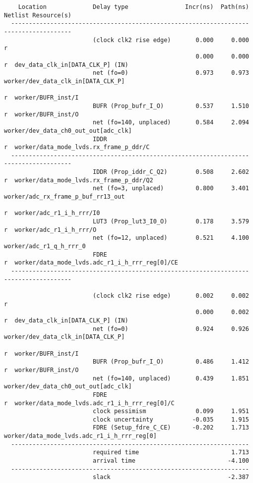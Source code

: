 \documentclass{article}
\begin{document}
\begin{lstlisting}
    Location             Delay type                Incr(ns)  Path(ns)    Netlist Resource(s)
  -------------------------------------------------------------------    -------------------
                         (clock clk2 rise edge)       0.000     0.000 r  
                                                      0.000     0.000 r  dev_data_clk_in[DATA_CLK_P] (IN)
                         net (fo=0)                   0.973     0.973    worker/dev_data_clk_in[DATA_CLK_P]
                                                                      r  worker/BUFR_inst/I
                         BUFR (Prop_bufr_I_O)         0.537     1.510 r  worker/BUFR_inst/O
                         net (fo=140, unplaced)       0.584     2.094    worker/dev_data_ch0_out_out[adc_clk]
                         IDDR                                         r  worker/data_mode_lvds.rx_frame_p_ddr/C
  -------------------------------------------------------------------    -------------------
                         IDDR (Prop_iddr_C_Q2)        0.508     2.602 r  worker/data_mode_lvds.rx_frame_p_ddr/Q2
                         net (fo=3, unplaced)         0.800     3.401    worker/adc_rx_frame_p_buf_rr13_out
                                                                      r  worker/adc_r1_i_h_rrr/I0
                         LUT3 (Prop_lut3_I0_O)        0.178     3.579 r  worker/adc_r1_i_h_rrr/O
                         net (fo=12, unplaced)        0.521     4.100    worker/adc_r1_q_h_rrr_0
                         FDRE                                         r  worker/data_mode_lvds.adc_r1_i_h_rrr_reg[0]/CE
  -------------------------------------------------------------------    -------------------

                         (clock clk2 rise edge)       0.002     0.002 r  
                                                      0.000     0.002 r  dev_data_clk_in[DATA_CLK_P] (IN)
                         net (fo=0)                   0.924     0.926    worker/dev_data_clk_in[DATA_CLK_P]
                                                                      r  worker/BUFR_inst/I
                         BUFR (Prop_bufr_I_O)         0.486     1.412 r  worker/BUFR_inst/O
                         net (fo=140, unplaced)       0.439     1.851    worker/dev_data_ch0_out_out[adc_clk]
                         FDRE                                         r  worker/data_mode_lvds.adc_r1_i_h_rrr_reg[0]/C
                         clock pessimism              0.099     1.951    
                         clock uncertainty           -0.035     1.915    
                         FDRE (Setup_fdre_C_CE)      -0.202     1.713    worker/data_mode_lvds.adc_r1_i_h_rrr_reg[0]
  -------------------------------------------------------------------
                         required time                          1.713    
                         arrival time                          -4.100    
  -------------------------------------------------------------------
                         slack                                 -2.387    




\end{lstlisting}
\end{document}
